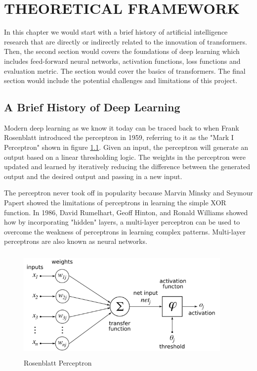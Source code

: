 \chapter{THEORETICAL FRAMEWORK}
\label{chap: 3}

In this chapter we would start with a brief history of artificial intelligence research that are directly or indirectly related to the innovation of transformers. Then, the second section would covers the foundations of deep learning which includes feed-forward neural networks, activation functions, loss functions and evaluation metric. The  section would cover the basics of transformers. The final section would include the potential challenges and limitations of this project.

\section{A Brief History of Deep Learning}

Modern deep learning as we know it today can be traced back to when Frank Rosenblatt introduced the perceptron in 1959, referring to it as the "Mark I Perceptron" shown in figure \ref{fig:perceptron}. Given an input, the perceptron will generate an output based on a linear thresholding logic. The weights in the perceptron were updated and learned by iteratively reducing the difference between the generated output and the desired output and passing in a new input.

The perceptron never took off in popularity because Marvin Minsky and Seymour Papert showed the limitations of perceptrons in learning the simple XOR function. In 1986, David Rumelhart, Geoff Hinton, and Ronald Williams showed how by incorporating "hidden" layers, a multi-layer perceptron can be used to overcome the weakness of perceptrons in learning complex patterns. Multi-layer perceptrons are also known as neural networks.

\begin{figure}[ht]
\includegraphics[width=10.5cm, height=5.5cm]{images/Rosenblattperceptron.png}
\centering
\caption{Rosenblatt Perceptron \protect\cite{markovbook}}
\label{fig:perceptron}
\end{figure}

